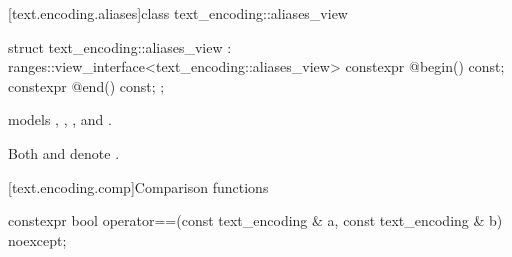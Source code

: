 \documentclass{wg21}
\begin{document}
\begin{addedblock}
%


[text.encoding.aliases]{class text_encoding::aliases_view}

\begin{codeblock}
struct text_encoding::aliases_view : ranges::view_interface<text_encoding::aliases_view> {\textbf{}
    constexpr @\impdef@ begin() const;
    constexpr @\impdef@ end() const;
};
\end{codeblock}

 models , , , and .

Both  and  denote .


%
%


[text.encoding.comp]{Comparison functions}

\begin{itemdecl}
    constexpr bool operator==(const text_encoding & a, const text_encoding & b) noexcept;
\end{itemdecl}

\begin{itemdescr}
    \returns


\end{itemdescr}
\end{addedblock}
\end{document}
